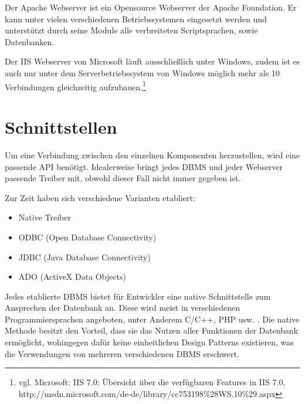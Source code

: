 Der Apache Webserver ist ein Opensource Webserver der Apache Foundation.
Er kann unter vielen verschiedenen Betriebssystemen eingesetzt werden und unterstützt durch seine Module alle verbreiteten Scriptsprachen, sowie Datenbanken.

Der IIS Webserver von Microsoft läuft ausschließlich unter Windows, zudem ist es auch nur unter dem Serverbetriebssystem von Windows möglich mehr als 10 Verbindungen gleichzeitig aufzubauen.\footnote{vgl. Microsoft: IIS 7.0: Übersicht über die verfügbaren Features in IIS 7.0, http://msdn.microsoft.com/de-de/library/cc753198\%28WS.10\%29.aspx}

\section{Schnittstellen}
\label{sec:schnittstellen}


Um eine Verbindung zwischen den einzelnen Komponenten herzustellen, wird eine passende API benötigt.
Idealerweise bringt jedes DBMS und jeder Webserver passende Treiber mit, obwohl dieser Fall nicht immer gegeben ist.

Zur Zeit haben sich verschiedene Varianten etabliert:

\begin{itemize}
\item Native Treiber
\item ODBC (Open Database Connectivity)
\item JDBC (Java Database Connectivity)
\item ADO (ActiveX Data Objects)
\end{itemize}

Jedes etablierte DBMS bietet für Entwickler eine native Schnittstelle zum Ansprechen der Datenbank an.
Diese wird meist in verschiedenen Programmiersprachen angeboten, unter Anderem C/C++, PHP usw. .
Die native Methode besitzt den Vorteil, dass sie das Nutzen aller Funktionen der Datenbank ermöglicht, wohingegen dafür keine einheitlichen Design Patterns existieren, was die Verwendungen von mehreren
verschiedenen DBMS erschwert.

